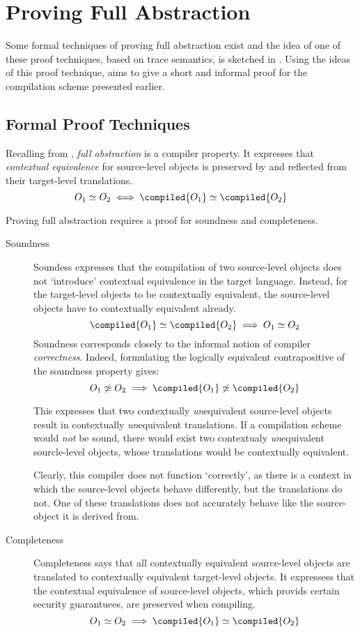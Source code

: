 \chapter{Proving Full Abstraction}
\label{chap:InformalProof}
Some formal techniques of proving full abstraction exist and the idea of one of these proof techniques, based on trace semantics, is sketched in .
Using the ideas of this proof technique,  aims to give a short and informal proof for the compilation scheme presented earlier.

\section{Formal Proof Techniques}
\label{sec:prooftechniques}
Recalling from \myref{}{}, \emph{full abstraction} is a compiler property.
It expresses that \emph{contextual equivalence} for source-level objects is preserved by and reflected from their target-level translations.
\[
    O_{1} \simeq O_{2} \iff \compiled{O_{1}} \simeq \compiled{O_{2}}
\]

Proving full abstraction requires a proof for soundness  and completeness.
\begin{description}
\item[Soundness]
Soundess expresses that the compilation of two source-level objects does not `introduce' contextual equivalence in the target language.
Instead, for the target-level objects to be contextually equivalent, the source-level objects have to contextually equivalent already.
\[
    \compiled{O_{1}} \simeq \compiled{O_{2}} \implies O_{1} \simeq O_{2}
\]
Soundness corresponds closely to the informal notion of compiler \emph{correctness}.
Indeed, formulating the logically equivalent contrapositive of the soundness property gives:
\[
    O_{1} \not\simeq O_{2} \implies \compiled{O_{1}} \not\simeq \compiled{O_{2}}
\]

This expresses that two contextually \emph{un}equivalent source-level objects result in contextually \emph{un}equivalent translations.
If a compilation scheme would \emph{not} be sound, there would exist two contextualy \emph{un}equivalent sourcle-level objects, whose translations would be contextually equivalent.

Clearly, this compiler does not function `correctly', as there is a context in which the source-level objects behave differently, but the translations do not.
One of these translations does not accurately behave like the source-object it is derived from.
\item[Completeness]
Completeness says that all contextually equivalent source-level objects are translated to contextually equivalent target-level objects.
It expressess that the contextual equivalence of source-level objects, which provids certain security guarantuees, are preserved when compiling.
\[
    O_{1} \simeq O_{2} \implies \compiled{O_{1}} \simeq \compiled{O_{2}}
\]
\end{description}

